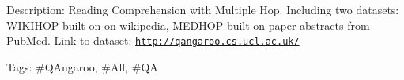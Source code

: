 Description\+: Reading Comprehension with Multiple Hop. Including two datasets\+: W\+I\+K\+I\+H\+OP built on on wikipedia, M\+E\+D\+H\+OP built on paper abstracts from Pub\+Med. Link to dataset\+: \href{http://qangaroo.cs.ucl.ac.uk/}{\tt http\+://qangaroo.\+cs.\+ucl.\+ac.\+uk/}

Tags\+: \#\+Q\+Angaroo, \#\+All, \#\+QA 